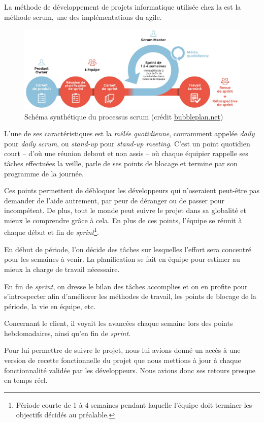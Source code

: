 La méthode de développement de projets informatique utilisée chez la \df est la méthode \gls{scrum}, une des implémentations du \gls{agile}.

\begin{figure}[H]
    \centering
    \includegraphics[width=1\linewidth]{img/scrum.jpeg}
    \caption{Schéma synthétique du processus \gls{scrum} (crédit \href{https://bubbleplan.net/blog/agile-scrum-gestion-projet/}{bubbleplan.net})}
\end{figure}

L'une de ses caractéristiques est la \emph{mêlée quotidienne}, couramment appelée \og \textit{daily} \fg pour \textit{daily scrum}, ou \og \textit{stand-up} \fg pour \textit{stand-up meeting}. C'est un point quotidien court -- d'où une réunion debout et non assis -- où chaque équipier rappelle ses tâches effectuées la veille, parle de ses points de blocage et termine par son programme de la journée.

Ces points permettent de débloquer les développeurs qui n'oseraient peut-être pas demander de l'aide autrement, par peur de déranger ou de passer pour incompétent. De plus, tout le monde peut suivre le projet dans sa globalité et mieux le comprendre grâce à cela. En plus de ces points, l'équipe se réunit à chaque début et fin de
\textit{sprint}\footnote{Période courte de 1 à 4 semaines pendant laquelle l'équipe doit terminer les objectifs décidés au préalable.}.

En début de période, l'on décide des tâches sur lesquelles l'effort sera concentré pour les semaines à venir. La planification se fait en équipe pour estimer au mieux la charge de travail nécessaire.

En fin de \textit{sprint}, on dresse le bilan des tâches accomplies et on en profite pour s'introspecter afin d'améliorer les méthodes de travail, les points de blocage de la période, la vie en équipe, etc.

Concernant le client, il voyait les avancées chaque semaine lors des points hebdomadaires, ainsi qu'en fin de \textit{sprint}.

Pour lui permettre de suivre le projet, nous lui avions donné un accès à une version de recette fonctionnelle du projet que nous mettions à jour à chaque fonctionnalité validée par les développeurs. Nous avions donc ses retours presque en temps réel.